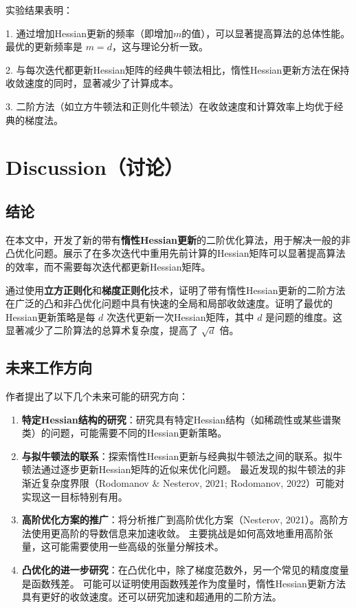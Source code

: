 \documentclass[a4paper,twoside,AutoFakeBold]{article}
\theoremstyle{definition}
\begin{document}
实验结果表明：

1. 通过增加Hessian更新的频率（即增加$m$的值），可以显著提高算法的总体性能。最优的更新频率是 
$m=d$，这与理论分析一致。

2. 与每次迭代都更新Hessian矩阵的经典牛顿法相比，惰性Hessian更新方法在保持收敛速度的同时，显著减少了计算成本。

3. 二阶方法（如立方牛顿法和正则化牛顿法）在收敛速度和计算效率上均优于经典的梯度法。



\newpage
\section{Discussion（讨论）}

\subsection{结论}

在本文中，开发了新的带有\textbf{惰性Hessian更新}的二阶优化算法，用于解决一般的非凸优化问题。展示了在多次迭代中重用先前计算的Hessian矩阵可以显著提高算法的效率，而不需要每次迭代都更新Hessian矩阵。

通过使用\textbf{立方正则化}和\textbf{梯度正则化}技术，证明了带有惰性Hessian更新的二阶方法在广泛的凸和非凸优化问题中具有快速的全局和局部收敛速度。证明了最优的Hessian更新策略是每 \(d\) 次迭代更新一次Hessian矩阵，其中 \(d\) 是问题的维度。这显著减少了二阶算法的总算术复杂度，提高了 \(\sqrt{d}\) 倍。
\subsection{未来工作方向}
作者提出了以下几个未来可能的研究方向：
\begin{enumerate}
    \item \textbf{特定Hessian结构的研究}：研究具有特定Hessian结构（如稀疏性或某些谱聚类）的问题，可能需要不同的Hessian更新策略。
    \item \textbf{与拟牛顿法的联系}：探索惰性Hessian更新与经典拟牛顿法之间的联系。拟牛顿法通过逐步更新Hessian矩阵的近似来优化问题。
    最近发现的拟牛顿法的非渐近复杂度界限（Rodomanov \& Nesterov, 2021; Rodomanov, 2022）可能对实现这一目标特别有用。
    \item \textbf{高阶优化方案的推广}：将分析推广到高阶优化方案（Nesterov, 2021）。高阶方法使用更高阶的导数信息来加速收敛。
	主要挑战是如何高效地重用高阶张量，这可能需要使用一些高级的张量分解技术。
    \item \textbf{凸优化的进一步研究}：在凸优化中，除了梯度范数外，另一个常见的精度度量是函数残差。
	可能可以证明使用函数残差作为度量时，惰性Hessian更新方法具有更好的收敛速度。还可以研究加速和超通用的二阶方法。
\end{enumerate}






\end{document}
